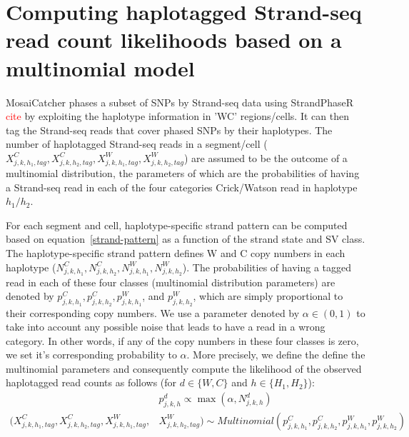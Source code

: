 \documentclass[12pt]{article}
\renewcommand{\j}{j} %
\newcommand{\X}{X} %
\renewcommand{\k}{k} %
\newcommand{\h}{h} %
\newcommand{\N}{N} %
\begin{document}
\section{Computing haplotagged Strand-seq read count likelihoods based on a multinomial model}

MosaiCatcher phases a subset of SNPs by Strand-seq data using StrandPhaseR \textcolor{red}{cite} by exploiting the haplotype information in 'WC' regions/cells.
It can then tag the Strand-seq reads that cover phased SNPs by their haplotypes. The number of haplotagged Strand-seq reads in a segment/cell ($\X^C_{\j,\k,\h_1,tag}, \X^C_{\j,\k,\h_2,tag}, \X^W_{\j,\k,\h_1,tag}, \X^W_{\j,\k,\h_2,tag}$) are assumed to be the outcome of a multinomial distribution, the parameters of which are the probabilities of having a Strand-seq read in each of the four categories Crick/Watson read in haplotype $h_1/h_2$.

For each segment and cell, haplotype-specific strand pattern can be computed based on equation~\ref{strand-pattern} as a function of the strand state and SV class. The haplotype-specific strand pattern defines W and C copy numbers in each haplotype ($\N^C_{\j,\k,\h_1}, \N^C_{\j,\k,\h_2}, \N^W_{\j,\k,\h_1}, \N^W_{\j,\k,\h_2}$).
The probabilities of having a tagged read in each of these four classes (multinomial distribution parameters) are denoted by $p^C_{\j,\k,\h_1}, p^C_{\j,\k,\h_2}, p^W_{\j,\k,\h_1}$, and $p^W_{\j,\k,\h_2}$, which are simply proportional to their corresponding copy  numbers. We use a parameter denoted by $\alpha \in (0,1)$ to take into account any possible noise that leads to have a read in a wrong category. In other words, if any of the copy numbers in these four classes is zero, we set it's corresponding probability to $\alpha$. More precisely, we define the define the multinomial parameters and consequently compute the likelihood of the observed haplotagged read counts as follows (for $d \in \{W, C\}$ and $\h \in \{H_1, H_2\}$):
\begin{align}
	&p^d_{\j,\k,\h} \propto \max(\alpha, \N^d_{\j,\k,\h}) \\
	(\X^C_{\j,\k,\h_1,tag}, \X^C_{\j,\k,\h_2,tag}, \X^W_{\j,\k,\h_1,tag},& \X^W_{\j,\k,\h_2,tag}) \sim \nonumber Multinomial(p^C_{\j,\k,\h_1}, p^C_{\j,\k,\h_2}, p^W_{\j,\k,\h_1}, p^W_{\j,\k,\h_2})
\end{align}


% 
% 
% 
% 




\end{document}
